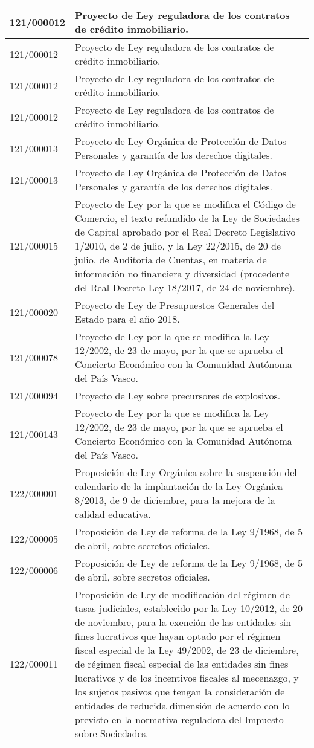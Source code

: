 {\begin{table}[H]
\begin{center}
\begin{tabularx}{\linewidth}{| l | X |}
\hline
121/000012 & Proyecto de Ley reguladora de los contratos de crédito inmobiliario. \\
\hline
121/000012 & Proyecto de Ley reguladora de los contratos de crédito inmobiliario. \\
\hline
121/000012 & Proyecto de Ley reguladora de los contratos de crédito inmobiliario. \\
\hline
121/000012 & Proyecto de Ley reguladora de los contratos de crédito inmobiliario. \\
\hline
121/000013 & Proyecto de Ley Orgánica de Protección de Datos Personales y garantía de los derechos digitales. \\
\hline
121/000013 & Proyecto de Ley Orgánica de Protección de Datos Personales y garantía de los derechos digitales. \\
\hline
121/000015 & Proyecto de Ley por la que se modifica el Código de Comercio, el texto refundido de la Ley de Sociedades de Capital aprobado por el Real Decreto Legislativo 1/2010, de 2 de julio, y la Ley 22/2015, de 20 de julio, de Auditoría de Cuentas, en materia de información no financiera y diversidad (procedente del Real Decreto-Ley 18/2017, de 24 de noviembre). \\
\hline
121/000020 & Proyecto de Ley de Presupuestos Generales del Estado para el año 2018. \\
\hline
121/000078 & Proyecto de Ley por la que se modifica la Ley 12/2002, de 23 de mayo, por la que se aprueba el Concierto Económico con la Comunidad Autónoma del País Vasco. \\
\hline
121/000094 & Proyecto de Ley sobre precursores de explosivos. \\
\hline
121/000143 & Proyecto de Ley por la que se modifica la Ley 12/2002, de 23 de mayo, por la que se aprueba el Concierto Económico con la Comunidad Autónoma del País Vasco. \\
\hline
122/000001 & Proposición de Ley Orgánica sobre la suspensión del calendario de la implantación de la Ley Orgánica 8/2013, de 9 de diciembre, para la mejora de la calidad educativa. \\
\hline
122/000005 & Proposición de Ley de reforma de la Ley 9/1968, de 5 de abril, sobre secretos oficiales. \\
\hline
122/000006 & Proposición de Ley de reforma de la Ley 9/1968, de 5 de abril, sobre secretos oficiales. \\
\hline
122/000011 & Proposición de Ley de modificación del régimen de tasas judiciales, establecido por la Ley 10/2012, de 20 de noviembre, para la exención de las entidades sin fines lucrativos que hayan optado por el régimen fiscal especial de la Ley 49/2002, de 23 de diciembre, de régimen fiscal especial de las entidades sin fines lucrativos y de los incentivos fiscales al mecenazgo, y los sujetos pasivos que tengan la consideración de entidades de reducida dimensión de acuerdo con lo previsto en la normativa reguladora del Impuesto sobre Sociedades. \\

\end{tabularx}
\end{center}
\end{table}}
